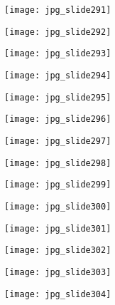 \documentclass[main.tex]{subfiles}
\begin{document}
\begin{center}
\texttt{[image: jpg\_slide291]}
\end{center}

\begin{center}
\texttt{[image: jpg\_slide292]}
\end{center}

\begin{center}
\texttt{[image: jpg\_slide293]}
\end{center}

\begin{center}
\texttt{[image: jpg\_slide294]}
\end{center}

\begin{center}
\texttt{[image: jpg\_slide295]}
\end{center}

\begin{center}
\texttt{[image: jpg\_slide296]}
\end{center}

\begin{center}
\texttt{[image: jpg\_slide297]}
\end{center}

\begin{center}
\texttt{[image: jpg\_slide298]}
\end{center}

\begin{center}
\texttt{[image: jpg\_slide299]}
\end{center}

\begin{center}
\texttt{[image: jpg\_slide300]}
\end{center}

\begin{center}
\texttt{[image: jpg\_slide301]}
\end{center}

\begin{center}
\texttt{[image: jpg\_slide302]}
\end{center}

\begin{center}
\texttt{[image: jpg\_slide303]}
\end{center}

\begin{center}
\texttt{[image: jpg\_slide304]}
\end{center}
\end{document}
